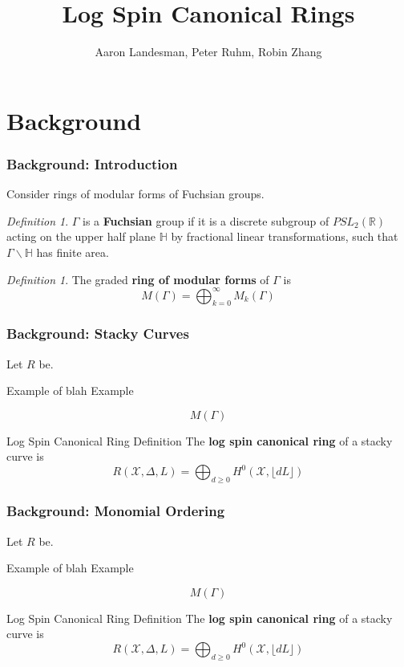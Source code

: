 \documentclass{beamer}
\title{Log Spin Canonical Rings}
\author{Aaron Landesman\inst{1}, Peter Ruhm\inst{2}, Robin Zhang\inst{3}}
\institute[] %
{
  \inst{1}
	Harvard University
	,
  \inst{2}
	Stanford University
  ,
  \inst{3}
	Stanford University
}
\theoremstyle{remark}
\newtheorem{defn}[thm]{Definition}
\newcommand\BH{{\mathbb H}}
\newcommand\BR{{\mathbb R}}
\newcommand \sx{{\mathscr X}}
\newcommand{\halfcan}{L}
\begin{document}
\begin{frame}
	\titlepage
\end{frame}

\section{Background} 

\begin{frame}
\frametitle{Background: Introduction}
Consider rings of modular forms of Fuchsian groups.

\pause
\begin{defn}
$\Gamma$ is a {\bf Fuchsian} group if it is a discrete subgroup of
$PSL_2(\BR)$ acting on the upper half plane $\BH$ by fractional
linear transformations, such that $\Gamma \backslash \BH$ has finite area.
\end{defn}

\pause
\begin{defn}
The graded {\bf ring of modular forms} of $\Gamma$ is
\[
   M(\Gamma) = \bigoplus_{k = 0}^\infty M_k(\Gamma)
\]
\end{defn}

\end{frame}


\begin{frame}
\frametitle{Background: Stacky Curves}
Let $R$ be.

\pause
\begin{exampleblock}{Example of blah}
Example
\end{exampleblock}

\pause
\[
   M(\Gamma)
\]

\pause
\begin{alertblock}{Log Spin Canonical Ring Definition}
The \textbf{log spin canonical ring} of a stacky curve is
\[
	R(\sx, \Delta, \halfcan) = \bigoplus_{d \geq 0} H^0(\sx, \lfloor d \halfcan \rfloor)
\]
\end{alertblock}

\end{frame}


\begin{frame}
\frametitle{Background: Monomial Ordering}
Let $R$ be.

\pause
\begin{exampleblock}{Example of blah}
Example
\end{exampleblock}

\pause
\[
   M(\Gamma)
\]

\pause
\begin{alertblock}{Log Spin Canonical Ring Definition}
The \textbf{log spin canonical ring} of a stacky curve is
\[
	R(\sx, \Delta, \halfcan) = \bigoplus_{d \geq 0} H^0(\sx, \lfloor d \halfcan \rfloor)
\]
\end{alertblock}

\end{frame}
\end{document}
